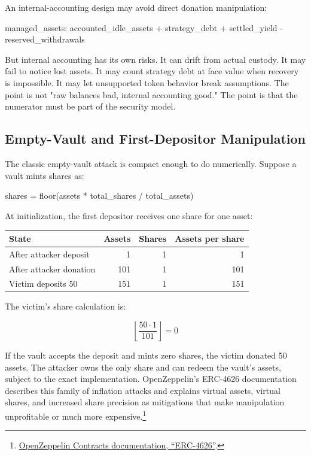 An internal-accounting design may avoid direct donation manipulation:

\begin{codeblock}
managed_assets:
    accounted_idle_assets
    + strategy_debt
    + settled_yield
    - reserved_withdrawals
\end{codeblock}

But internal accounting has its own risks. It can drift from actual custody. It may fail to notice lost assets. It may count strategy debt at face value when recovery is impossible. It may let unsupported token behavior break assumptions. The point is not "raw balances bad, internal accounting good." The point is that the numerator must be part of the security model.

\subsection{Empty-Vault and First-Depositor Manipulation}

The classic empty-vault attack is compact enough to do numerically. Suppose a vault mints shares as:

\begin{codeblock}
shares = floor(assets * total_shares / total_assets)
\end{codeblock}

At initialization, the first depositor receives one share for one asset:

\begin{center}
\begin{tabular}{@{}lrrr@{}}
\toprule
State & Assets & Shares & Assets per share \\
\midrule
After attacker deposit & 1 & 1 & 1 \\
After attacker donation & 101 & 1 & 101 \\
Victim deposits 50 & 151 & 1 & 151 \\
\bottomrule
\end{tabular}
\end{center}

The victim's share calculation is:

\[
\left\lfloor \frac{50 \cdot 1}{101} \right\rfloor = 0
\]

If the vault accepts the deposit and mints zero shares, the victim donated 50 assets. The attacker owns the only share and can redeem the vault's assets, subject to the exact implementation. OpenZeppelin's ERC-4626 documentation describes this family of inflation attacks and explains virtual assets, virtual shares, and increased share precision as mitigations that make manipulation unprofitable or much more expensive.\footnote{\href{https://docs.openzeppelin.com/contracts/5.x/erc4626}{OpenZeppelin Contracts documentation, ``ERC-4626''}.}

